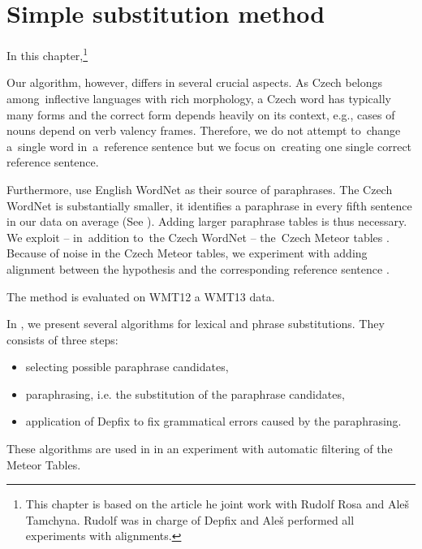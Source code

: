 \chapter{Simple substitution method}

In this chapter,\footnote{This chapter is based on the article 
\citep{barancikova:2014} he joint work with Rudolf Rosa and Ale\v{s} Tamchyna.
Rudolf was in charge of Depfix and Ale\v{s} performed all experiments with 
alignments. } 

Our algorithm, however, differs in several crucial aspects. As Czech belongs 
among~inflective languages with rich morphology, a Czech word has typically 
many forms and the correct form depends heavily on its context, e.g., cases 
of nouns depend on verb valency frames. Therefore, we do not attempt to~change 
a~single word in~a~reference sentence but we focus on~creating one single correct 
reference sentence.

Furthermore, \citet{kauchak} use English WordNet as their source of paraphrases.
The Czech WordNet \citep{czech-wordnet} is substantially smaller, it identifies a
paraphrase in every fifth sentence in our data on average (See ).
Adding larger paraphrase tables is thus necessary. We exploit --  in~addition 
to~the Czech WordNet --  the~Czech Meteor tables \citep{meteor-tables}.  
Because of noise in the Czech Meteor tables, we experiment with adding alignment
between the hypothesis and the corresponding reference sentence .

The method is evaluated on WMT12 a WMT13 data.

In , we present several algorithms for lexical and phrase 
substitutions. They consists of three steps:

\begin{itemize}
\item selecting possible paraphrase candidates, 
\item paraphrasing, i.e. the substitution of the paraphrase candidates,
\item application of Depfix to fix grammatical errors caused by the paraphrasing.
\end{itemize}

These algorithms are used in  in an experiment with
automatic filtering of the Meteor Tables.

